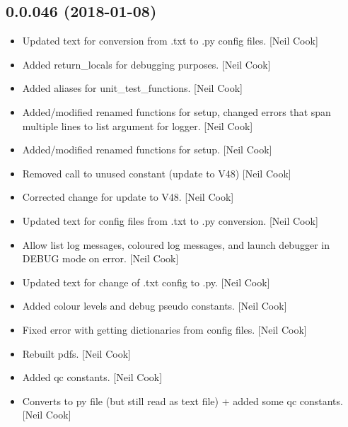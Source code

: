 \documentclass[a4paper,10pt,english]{report}
\begin{document}
\subsection{0.0.046 (2018-01-08)}
\label{\detokenize{misc/changelog:id504}}\begin{itemize}
\item {} 
Updated text for conversion from .txt to .py config files. {[}Neil Cook{]}

\item {} 
Added return\_locals for debugging purposes. {[}Neil Cook{]}

\item {} 
Added aliases for unit\_test\_functions. {[}Neil Cook{]}

\item {} 
Added/modified renamed functions for setup, changed errors that span
multiple lines to list argument for logger. {[}Neil Cook{]}

\item {} 
Added/modified renamed functions for setup. {[}Neil Cook{]}

\item {} 
Removed call to unused constant (update to V48) {[}Neil Cook{]}

\item {} 
Corrected change for update to V48. {[}Neil Cook{]}

\item {} 
Updated text for config files from .txt to .py conversion. {[}Neil Cook{]}

\item {} 
Allow list log messages, coloured log messages, and launch debugger in
DEBUG mode on error. {[}Neil Cook{]}

\item {} 
Updated text for change of .txt config to .py. {[}Neil Cook{]}

\item {} 
Added colour levels and debug pseudo constants. {[}Neil Cook{]}

\item {} 
Fixed error with getting dictionaries from config files. {[}Neil Cook{]}

\item {} 
Rebuilt pdfs. {[}Neil Cook{]}

\item {} 
Added qc constants. {[}Neil Cook{]}

\item {} 
Converts to py file (but still read as text file) + added some qc
constants. {[}Neil Cook{]}


\end{itemize}
\end{document}
